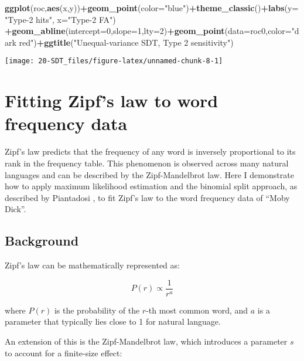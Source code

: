 \documentclass[
]{book}
\newenvironment{Shaded}{\begin{snugshade}}{\end{snugshade}}
\newcommand{\AttributeTok}[1]{\textcolor[rgb]{0.13,0.29,0.53}{#1}}
\newcommand{\DecValTok}[1]{\textcolor[rgb]{0.00,0.00,0.81}{#1}}
\newcommand{\FunctionTok}[1]{\textcolor[rgb]{0.13,0.29,0.53}{\textbf{#1}}}
\newcommand{\NormalTok}[1]{#1}
\newcommand{\SpecialCharTok}[1]{\textcolor[rgb]{0.81,0.36,0.00}{\textbf{#1}}}
\newcommand{\StringTok}[1]{\textcolor[rgb]{0.31,0.60,0.02}{#1}}
\begin{document}
\begin{Shaded}
\begin{Highlighting}[]
\FunctionTok{ggplot}\NormalTok{(roc,}\FunctionTok{aes}\NormalTok{(x,y))}\SpecialCharTok{+}\FunctionTok{geom\_point}\NormalTok{(}\AttributeTok{color=}\StringTok{"blue"}\NormalTok{)}\SpecialCharTok{+}\FunctionTok{theme\_classic}\NormalTok{()}\SpecialCharTok{+}\FunctionTok{labs}\NormalTok{(}\AttributeTok{y=}\StringTok{"Type{-}2 hits"}\NormalTok{, }\AttributeTok{x=}\StringTok{"Type{-}2 FA"}\NormalTok{) }\SpecialCharTok{+}\FunctionTok{geom\_abline}\NormalTok{(}\AttributeTok{intercept=}\DecValTok{0}\NormalTok{,}\AttributeTok{slope=}\DecValTok{1}\NormalTok{,}\AttributeTok{lty=}\DecValTok{2}\NormalTok{)}\SpecialCharTok{+}\FunctionTok{geom\_point}\NormalTok{(}\AttributeTok{data=}\NormalTok{roc0,}\AttributeTok{color=}\StringTok{"dark red"}\NormalTok{)}\SpecialCharTok{+}\FunctionTok{ggtitle}\NormalTok{(}\StringTok{"Unequal{-}variance SDT, Type 2 sensitivity"}\NormalTok{)}
\end{Highlighting}
\end{Shaded}

\begin{center}\texttt{[image: 20-SDT\_files/figure-latex/unnamed-chunk-8-1]} \end{center}

\chapter{Fitting Zipf's law to word frequency data}\label{fitting-zipfs-law-to-word-frequency-data}

Zipf's law predicts that the frequency of any word is inversely proportional to its rank in the frequency table. This phenomenon is observed across many natural languages and can be described by the Zipf-Mandelbrot law. Here I demonstrate how to apply maximum likelihood estimation and the binomial split approach, as described by Piantadosi \citep{PiantadosiZipf}, to fit Zipf's law to the word frequency data of ``Moby Dick''.

\section{Background}\label{background}

Zipf's law can be mathematically represented as:

\[ P(r) \propto \frac{1}{r^a} \]

where \(P(r)\) is the probability of the \(r\)-th most common word, and \(a\) is a parameter that typically lies close to 1 for natural language.

An extension of this is the Zipf-Mandelbrot law, which introduces a parameter \(s\) to account for a finite-size effect:
\end{document}
